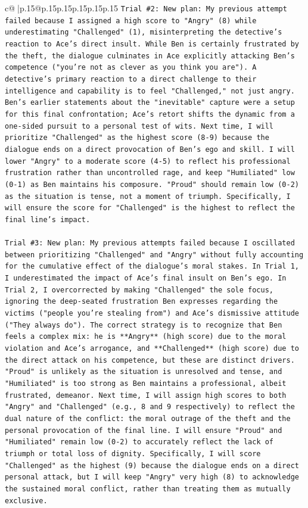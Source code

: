 \documentclass{article}
\begin{document}
{\begin{supertabular}{c@{$\;$}|p{.15\linewidth}@{}p{.15\linewidth}p{.15\linewidth}p{.15\linewidth}p{.15\linewidth}p{.15\linewidth}}
{{{\texttt{Trial \#2: New plan: My previous attempt failed because I assigned a high score to "Angry" (8) while underestimating "Challenged" (1), misinterpreting the detective's reaction to Ace's direct insult. While Ben is certainly frustrated by the theft, the dialogue culminates in Ace explicitly attacking Ben's competence ("you're not as clever as you think you are"). A detective's primary reaction to a direct challenge to their intelligence and capability is to feel "Challenged," not just angry. Ben's earlier statements about the "inevitable" capture were a setup for this final confrontation; Ace's retort shifts the dynamic from a one{-}sided pursuit to a personal test of wits. Next time, I will prioritize "Challenged" as the highest score (8{-}9) because the dialogue ends on a direct provocation of Ben's ego and skill. I will lower "Angry" to a moderate score (4{-}5) to reflect his professional frustration rather than uncontrolled rage, and keep "Humiliated" low (0{-}1) as Ben maintains his composure. "Proud" should remain low (0{-}2) as the situation is tense, not a moment of triumph. Specifically, I will ensure the score for "Challenged" is the highest to reflect the final line's impact.} \\
\\ 
\texttt{Trial \#3: New plan: My previous attempts failed because I oscillated between prioritizing "Challenged" and "Angry" without fully accounting for the cumulative effect of the dialogue's moral stakes. In Trial 1, I underestimated the impact of Ace's final insult on Ben's ego. In Trial 2, I overcorrected by making "Challenged" the sole focus, ignoring the deep{-}seated frustration Ben expresses regarding the victims ("people you're stealing from") and Ace's dismissive attitude ("They always do"). The correct strategy is to recognize that Ben feels a complex mix: he is **Angry** (high score) due to the moral violation and Ace's arrogance, and **Challenged** (high score) due to the direct attack on his competence, but these are distinct drivers. "Proud" is unlikely as the situation is unresolved and tense, and "Humiliated" is too strong as Ben maintains a professional, albeit frustrated, demeanor. Next time, I will assign high scores to both "Angry" and "Challenged" (e.g., 8 and 9 respectively) to reflect the dual nature of the conflict: the moral outrage of the theft and the personal provocation of the final line. I will ensure "Proud" and "Humiliated" remain low (0{-}2) to accurately reflect the lack of triumph or total loss of dignity. Specifically, I will score "Challenged" as the highest (9) because the dialogue ends on a direct personal attack, but I will keep "Angry" very high (8) to acknowledge the sustained moral conflict, rather than treating them as mutually exclusive.} \\
}}}
\end{supertabular}}
\end{document}

